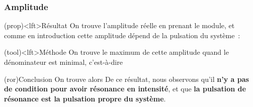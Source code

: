 \documentclass[../../main/main.tex]{subfiles}
\begin{document}
\subsubsection{Amplitude}

\begin{tcb}(prop)<lft>{Résultat}
	On trouve l'amplitude réelle en prenant le module, et comme en introduction
	cette amplitude dépend de la pulsation du système~:
	\psw{
		\[
			\boxed{
				I(\w)
				= \abs{\Iu}
				= \frac{E_0/R}{\sqrt{1 + Q^2\left( \dfrac{\w}{\w_0} - \dfrac{\w_0}{\w}
						\right)^2}}
			}
		\]
	}
	\vspace{-15pt}
\end{tcb}
\begin{tcb}(tool)<lft>{Méthode}
	On trouve le maximum de cette amplitude quand le dénominateur est minimal,
	c'est-à-dire
	\vspace{-15pt}
\end{tcb}
\begin{tcb}(ror){Conclusion}
	On trouve alors
	\psw{
		\[\boxed{
				I_{\max} = I(\w_0) = \frac{E_0}{R}
			}
			\qet
			\boxed{
				I\xrightarrow[\w\to0^+]{} 0}
			\qet
			\boxed{
				I\xrightarrow[\w\to+\infty]{} 0}
		\]
	}
	De ce résultat, nous observons qu'il \textbf{n'y a pas de condition pour avoir
		résonance en intensité}, et que \textbf{la pulsation de résonance est la
		pulsation propre du système}.
\end{tcb}

\vspace{-20pt}
\end{document}
